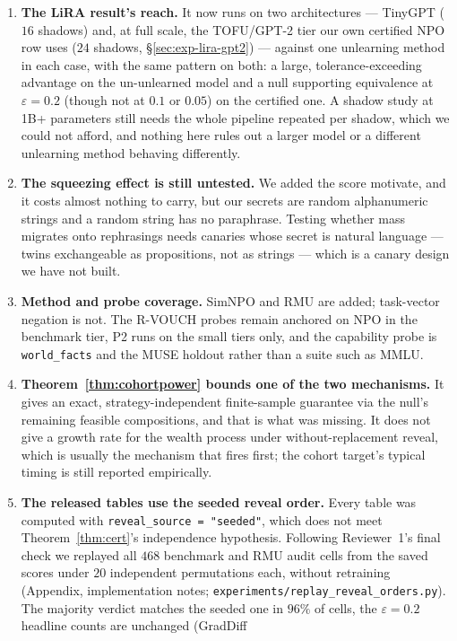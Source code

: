 \documentclass[11pt,a4paper]{article}
\newcommand{\eps}{\varepsilon}
\begin{document}
\begin{enumerate}[leftmargin=1.4em,itemsep=3pt]
\item \textbf{The LiRA result's reach.} It now runs on two architectures ---
TinyGPT ($16$ shadows) and, at full scale, the TOFU/GPT-2 tier our own certified NPO
row uses ($24$ shadows, \S\ref{sec:exp-lira-gpt2}) --- against one unlearning method
in each case, with the same pattern on both: a large, tolerance-exceeding advantage on
the un-unlearned model and a null supporting equivalence at $\eps=0.2$ (though not at
$0.1$ or $0.05$) on the certified one. A shadow study at 1B+ parameters still needs the whole pipeline repeated per
shadow, which we could not afford, and nothing here rules out a larger model or a
different unlearning method behaving differently.
\item \textbf{The squeezing effect is still untested.} We added the score
\citet{li2026beliefs} motivate, and it costs almost nothing to carry, but our secrets
are random alphanumeric strings and a random string has no paraphrase. Testing whether
mass migrates onto rephrasings needs canaries whose secret is natural language --- twins
exchangeable as propositions, not as strings --- which is a canary design we have not
built.
\item \textbf{Method and probe coverage.} SimNPO and RMU are added; task-vector
negation is not. The R-VOUCH probes remain anchored on NPO in the benchmark tier, P2
runs on the small tiers only, and the capability probe is \texttt{world\_facts} and
the MUSE holdout rather than a suite such as MMLU.
\item \textbf{Theorem~\ref{thm:cohortpower} bounds one of the two mechanisms.} It gives an exact,
strategy-independent finite-sample guarantee via the null's remaining feasible
compositions, and that is what was missing. It does not give a growth rate for the
wealth process under without-replacement reveal, which is usually the mechanism that
fires first; the cohort target's typical timing is still reported empirically.
\item \textbf{The released tables use the seeded reveal order.} Every table was
computed with \texttt{reveal\_source = "seeded"}, which does not meet
Theorem~\ref{thm:cert}'s independence hypothesis. Following Reviewer~1's final check we
replayed all $468$ benchmark and RMU audit cells from the saved scores under $20$
independent permutations each, without retraining (Appendix, implementation notes;
\texttt{experiments/replay\_reveal\_orders.py}). The majority verdict matches the
seeded one in $96\%$ of cells, the $\eps=0.2$ headline counts are unchanged (GradDiff

\end{enumerate}
\end{document}
